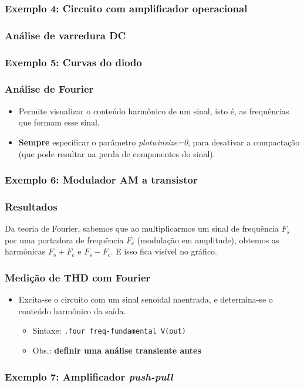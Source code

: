 \documentclass{beamer}
\begin{document}
\begin{frame}
\frametitle{Exemplo 4: Circuito com amplificador operacional}
\end{frame}

\begin{frame}
\frametitle{Análise de varredura DC}
\end{frame}

\begin{frame}
\frametitle{Exemplo 5: Curvas do diodo}
\end{frame}

\begin{frame}
\frametitle{Análise de Fourier}
\begin{itemize}
\item Permite visualizar o conteúdo harmônico de um sinal, isto é, as frequências que formam esse sinal.
\item \textbf{Sempre} especificar o parâmetro \textit{plotwinsize=0}, para desativar a compactação (que pode resultar na perda de componentes do sinal).
\end{itemize}
\end{frame}

\begin{frame}
\frametitle{Exemplo 6: Modulador AM a transistor}
\end{frame}

\begin{frame}
\frametitle{Resultados}
Da teoria de Fourier, sabemos que ao multiplicarmos um sinal de frequência $F_s$ por uma portadora de frequência $F_c$ (modulação em amplitude), obtemos as harmônicas $F_s + F_c$ e $F_s - F_c$. E isso fica visível no gráfico.
\end{frame}

\begin{frame}
\frametitle{Medição de THD com Fourier}
\begin{itemize}
\item Excita-se o circuito com um sinal senoidal naentrada, e determina-se o conteúdo harmônico da saída.
\begin{itemize}
\item Sintaxe: \texttt{.four freq-fundamental V(out)}
\item Obs.: \textbf{definir uma análise transiente antes}
\end{itemize}
\end{itemize}
\end{frame}

\begin{frame}
\frametitle{Exemplo 7: Amplificador \textit{push-pull}}
\end{frame}
\end{document}
